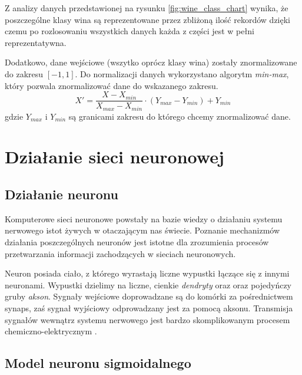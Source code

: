 \documentclass[a4paper,12pt]{article}
\numberwithin{equation}{section}
\begin{document}
Z analizy danych przedstawionej na rysunku \ref{fig:wine_class_chart} wynika, że poszczególne klasy wina są reprezentowane przez zbliżoną ilość rekordów dzięki czemu po rozlosowaniu wszystkich danych każda z części jest w pełni reprezentatywna.

Dodatkowo, dane wejściowe (wszytko oprócz klasy wina) zostały znormalizowane do zakresu $[-1,1]$. Do normalizacji danych wykorzystano algorytm \textit{min-max}, który pozwala znormalizować dane do wskazanego zakresu.
\begin{equation}
    X'=\frac{X-X_{min}}{X_{max}-X_{min}} \cdot (Y_{max} - Y_{min}) + Y_{min}
\end{equation}
gdzie $Y_{max}$ i $Y_{min}$ są granicami zakresu do którego chcemy znormalizować dane.


\section{Działanie sieci neuronowej}

\subsection{Działanie neuronu}
Komputerowe sieci neuronowe powstały na bazie wiedzy o działaniu systemu nerwowego istot żywych w otaczającym nas świecie. Poznanie mechanizmów działania poszczególnych neuronów jest istotne dla zrozumienia procesów przetwarzania informacji zachodzących w sieciach neuronowych.

Neuron posiada ciało, z którego wyrastają liczne wypustki łączące się z innymi neuronami. Wypustki dzielimy na liczne, cienkie \textit{dendryty} oraz oraz pojedyńczy gruby \textit{akson}. Sygnały wejściowe doprowadzane są do komórki za pośrednictwem synaps, zaś sygnał wyjściowy odprowadzany jest za pomocą aksonu. Transmisja sygnałów wewnątrz systemu nerwowego jest bardzo skomplikowanym procesem chemiczno-elektrycznym \cite{book_osowski}.


\subsection{Model neuronu sigmoidalnego}
\end{document}
